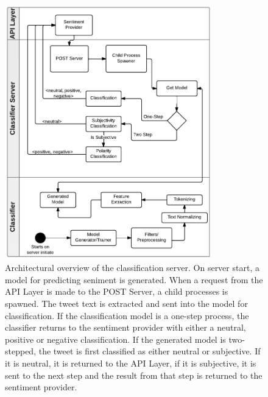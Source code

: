 \begin{figure}[htb!]
 \begin{center}
     \includegraphics[width=0.8\textwidth]{../img/ClassifierArcitechture30.pdf}
 \end{center}
 \caption[Architectural overview of the classification server.]{Architectural overview of the classification server. On server start, a model for predicting seniment is generated. When a request from the API Layer is made to the POST Server, a child processes is spawned. The tweet text is extracted and sent into the model for classification. If the classification model is a one-step process, the classifier returns to the sentiment provider with either a neutral, positive or negative classification. If the generated model is two-stepped, the tweet is first classified as either neutral or subjective. If it is neutral, it is returned to the API Layer, if it is subjective, it is sent to the next step and the result from that step is returned to the sentiment provider.}
 \label{fig:ClassifierArcitechture}
\end{figure}


